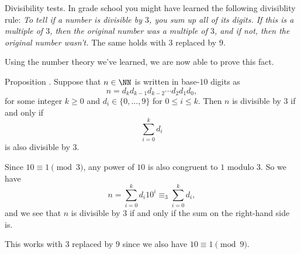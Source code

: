 \medskip\boldlabel Divisibility tests.
In grade school you might have learned the following divisiblity rule:
{\sl To tell if a number is divisible by $3$, you sum up all of its digits. If this is a
multiple of $3$, then the original number was a multiple of $3$, and if not, then the original
number wasn't.} The same holds with $3$ replaced by $9$.

Using the number theory we've learned, we are now able to prove this fact.

\proclaim Proposition \advthm. Suppose that $n\in \NN$ is written in base-$10$ digits as
$$n = d_k d_{k-1} d_{k-2}\cdots d_2 d_1 d_0,$$
for some integer $k\ge 0$ and $d_i\in \{0,\ldots,9\}$ for $0\le i\le k$.
Then $n$ is divisible by $3$ if and only if
$$\sum_{i=0}^k d_i$$
is also divisible by $3$.

\proof Since $10\equiv 1\pmod 3$, any power of $10$ is also congruent to $1$ modulo $3$. So we have
$$n = \sum_{i=0}^k d_i 10^i \equiv_3 \sum_{i=0}^k d_i,$$
and we see that $n$ is divisible by $3$ if and only if the sum on the right-hand side is.\slug

This works with $3$ replaced by $9$ since we also have $10\equiv 1\pmod 9$.

\bye

